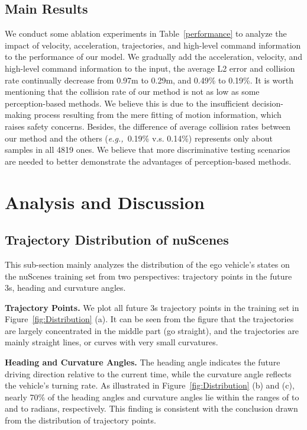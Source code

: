 \documentclass[10pt,twocolumn,letterpaper]{article}
\def\eg{\emph{e.g.,~}}
\newcommand{\myPara}[1]{\vspace{.05in}\noindent\textbf{#1.}\quad}
\begin{document}
\subsection{Main Results}
We conduct some ablation experiments 
in Table~\ref{performance}
to analyze the impact of 
velocity, acceleration, trajectories, and high-level command information to the performance of our model. 
We gradually add the acceleration, velocity, and high-level command information 
to the input, the average L2 error and 
collision rate continually decrease
from 0.97m to 0.29m, and 
0.49\% to 0.19\%.
It is worth mentioning that the collision rate of our method is not as low as some perception-based methods. We believe this is due to the insufficient decision-making process resulting from the mere fitting of motion information, which raises safety concerns.
Besides, the difference of average collision rates between our method and the others (\eg{0.19\% v.s. 0.14\%}) represents only about  samples in all 4819 ones. 
We believe that more discriminative testing scenarios are needed to better demonstrate the advantages of perception-based methods.


\section{Analysis and Discussion}

\subsection{Trajectory Distribution of nuScenes}
This sub-section mainly analyzes the distribution of 
the ego vehicle's states on
the nuScenes training set from two perspectives: 
trajectory points in the future 3s, heading and curvature angles. 


\myPara{Trajectory Points} 
We plot all future 3s trajectory points in 
the training set in Figure~\ref{fig:Distribution} (a). 
It can be seen from the figure that the trajectories
are largely concentrated in the middle part (go straight), 
and the trajectories are mainly straight lines, or curves with very small curvatures.


\myPara{Heading and Curvature Angles}
The heading angle indicates the future driving direction relative to the current time, 
while the curvature angle reflects the vehicle's turning rate. 
As illustrated in Figure~\ref{fig:Distribution} (b) and (c), nearly 70\% of the heading angles and curvature angles lie within the ranges of  to  and  to  radians, respectively.
This finding is consistent with the conclusion drawn from the distribution of trajectory points.
\end{document}
